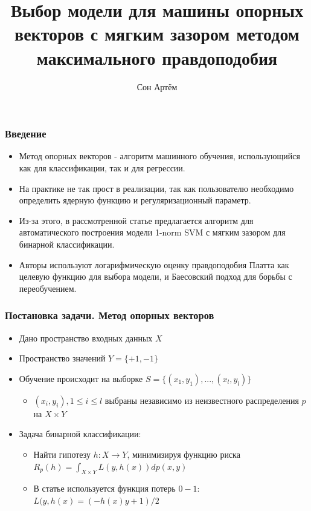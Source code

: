 \documentclass{beamer}
\title{Выбор модели для машины опорных векторов с мягким зазором методом
максимального правдоподобия}
\author{Сон Артём}
\begin{document}
\maketitle

\begin{frame}
	\frametitle{Введение}
	\begin{itemize}
		\item Метод опорных векторов - алгоритм машинного обучения,
		      использующийся как для классификации, так и для регрессии.
		\item На практике не так прост в реализации, так как пользователю
		      необходимо определить ядерную функцию и регуляризационный параметр.

		\item Из-за этого, в рассмотренной статье предлагается алгоритм для
		      автоматического построения модели 1-norm SVM с мягким зазором для
		      бинарной классификации.
		\item Авторы используют логарифмическую оценку правдоподобия Платта как
		      целевую функцию для выбора модели, и Баесовский подход для борьбы с
		      переобучением.
	\end{itemize}
\end{frame}

\begin{frame}
	\frametitle{Постановка задачи. Метод опорных векторов}

	\begin{itemize}
		\item Дано пространство входных данных $X$
		\item  Пространство значений $Y = \{+1, -1\}$
		\item Обучение происходит на выборке $S = \{ (x_1, y_1), ... , (x_l,
			      y_l)\}$
		      \begin{itemize}
			      \item $(x_i, y_i), 1 \leq i \leq l$ выбраны независимо из
			            неизвестного распределения $p$ на $X \times Y$
		      \end{itemize}

		\item Задача бинарной классификации:
		      \begin{itemize}
			      \item Найти гипотезу $h: X \rightarrow Y$, минимизируя функцию
			            риска $R_p(h) = \int_{X \times Y}^{} L(y, h(x))dp(x, y)$
			      \item В статье используется функция потерь $0-1$: $L(y, h(x) = (-h(x)y
				            + 1) / 2$
		      \end{itemize}
	\end{itemize}
\end{frame}
\end{document}
